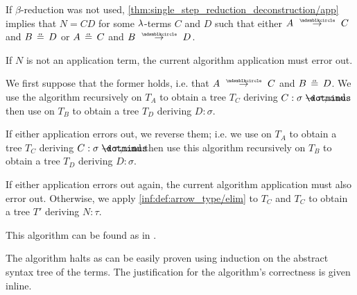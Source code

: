 \begin{algorithm}
\begin{thmenum}
\begin{thmenum}
       If \( \beta \)-reduction was not used, \cref{thm:single_step_reduction_deconstruction/app} implies that \( N = CD \) for some \( {\mathrm \lambda} \)-terms \( C \) and \( D \) such that either \( A \pred C \) and \( B \aequiv D \) or \( A \aequiv C \) and \( B \pred D \).

      If \( N \) is not an application term, the current algorithm application must error out.

      We first suppose that the former holds, i.e. that \( A \pred C \) and \( B \aequiv D \). We use the algorithm recursively on \( T_A \) to obtain a tree \( T_C \) deriving \( C: \sigma \synimplies \tau \), and then use  on \( T_B \) to obtain a tree \( T_D \) deriving \( D: \sigma \).

      If either application errors out, we reverse them; i.e. we use  on \( T_A \) to obtain a tree \( T_C \) deriving \( C: \sigma \synimplies \tau \), and then use this algorithm recursively on \( T_B \) to obtain a tree \( T_D \) deriving \( D: \sigma \).

      If either application errors out again, the current algorithm application must also error out. Otherwise, we apply \ref{inf:def:arrow_type/elim} to \( T_C \) and \( T_C \) to obtain a tree \( T' \) deriving \( N: \tau \).
    \end{thmenum}
  \end{thmenum}
\end{algorithm}
\begin{comments}
  \item This algorithm can be found as  in \cite{notebook:code}.
\end{comments}
\begin{defproof}
  The algorithm halts as can be easily proven using induction on the abstract syntax tree of the terms. The justification for the algorithm's correctness is given inline.
\end{defproof}

